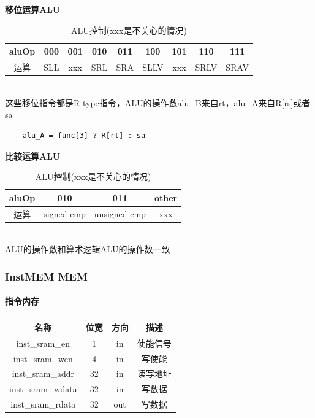 \documentclass[UTF8]{ctexart}
\begin{document}
\textbf{移位运算ALU} \\
\begin{table}[h]
    \centering
    \begin{tabular}{|c|c|c|c|c|c|c|c|c|}
        \hline
        aluOp & 000 & 001 & 010 & 011 & 100 & 101 & 110 & 111 \\ \hline
        运算  & SLL & xxx & SRL & SRA & SLLV & xxx & SRLV & SRAV \\ \hline
    \end{tabular}
        \caption{ALU控制(xxx是不关心的情况)}
\end{table}\\
这些移位指令都是R-type指令，ALU的操作数alu\_B来自rt，alu\_A来自R[rs]或者sa
\begin{verbatim}
    alu_A = func[3] ? R[rt] : sa
\end{verbatim}

\textbf{比较运算ALU} \\
\begin{table}[h]
    \centering
    \begin{tabular}{|c|c|c|c|}
        \hline
        aluOp & 010 & 011 & other\\ \hline
        运算  & signed cmp & unsigned cmp  & xxx \\ \hline
    \end{tabular}
        \caption{ALU控制(xxx是不关心的情况)}
\end{table}\\
ALU的操作数和算术逻辑ALU的操作数一致

\subsubsection{InstMEM  MEM}
\paragraph{指令内存}
\begin{table}[h]
    \centering
    \begin{tabular}{|c|c|c|c|}
        \hline  
        名称 & 位宽 & 方向 & 描述 \\ \hline
        inst\_sram\_en & 1 & in & 使能信号 \\ \hline 
        inst\_sram\_wen& 4 & in & 写使能 \\ \hline 
        inst\_sram\_addr & 32 & in & 读写地址 \\ \hline 
        inst\_sram\_wdata & 32 & in & 写数据 \\ \hline 
        inst\_sram\_rdata & 32 & out & 写数据 \\ \hline
    \end{tabular}
\end{table}
\end{document}

